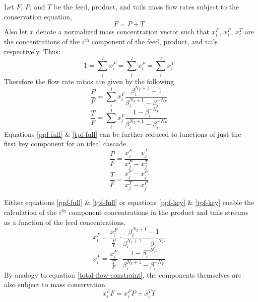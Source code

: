 \documentclass[preprint,12pt]{elsarticle}
\newcommand{\ith}[0]{$i^{\mbox{th}}$ }
\begin{document}
Let $F$, $P$, and $T$ be the feed, product, and tails mass flow rates subject to 
the conservation equation,
\begin{equation}
F = P + T
\label{total-flow-constraint}
\end{equation}
Also let $x$ denote a normalized mass concentration vector such that $x_i^F$, 
$x_i^P$, $x_i^T$ are the concentrations of the \ith component of the feed, product,
and tails respectively.  Thus:
\begin{equation}
1 = \sum_i^I x_i^F = \sum_i^I x_i^P = \sum_i^I x_i^T 
\end{equation}
Therefore the flow rate ratios are given by the following.
\begin{equation}
\frac{P}{F} = \sum_i^I x_i^F\frac{\beta_i^{N_T+1} - 1}
                                 {\beta_i^{N_T+1} - \beta_i^{-N_P}}
\label{ppf-full}
\end{equation}
\begin{equation}
\frac{T}{F} = \sum_i^I x_i^F\frac{1 - \beta_i^{-N_P}}
                                 {\beta_i^{N_T+1} - \beta_i^{-N_P}}
\label{tpf-full}
\end{equation}
Equations \ref{ppf-full} \&  \ref{tpf-full} can be further reduced to functions
of just the first key component for an ideal cascade.
\begin{equation}
\frac{P}{F} = \frac{x_j^F - x_j^T}{x_j^P - x_j^T}
\label{ppf-key}
\end{equation}
\begin{equation}
\frac{T}{F} = \frac{x_j^F - x_j^P}{x_j^T - x_j^P}
\label{tpf-key}
\end{equation}

Either equations \ref{ppf-full} \& \ref{tpf-full} or equations \ref{ppf-key} \& 
\ref{tpf-key} enable the calculation of the \ith component concentrations in the 
product and tails streams as a function of the feed concentrations.
\begin{equation}
x_i^P = \frac{x_i^F}{\frac{P}{F}}\cdot\frac{\beta_i^{N_T+1} - 1}
                                           {\beta_i^{N_T+1} - \beta_i^{-N_P}}
\label{prod-concentration}
\end{equation}
\begin{equation}
x_i^T = \frac{x_i^F}{\frac{T}{F}}\cdot\frac{1 - \beta_i^{-N_P}}
                                           {\beta_i^{N_T+1} - \beta_i^{-N_P}}
\label{tail-concentration}
\end{equation}
By analogy to equation \ref{total-flow-constraint}, the components themselves are
also subject to mass conservation:
\begin{equation}
x_i^FF = x_i^PP + x_i^TT
\label{comp-flow-constraint}
\end{equation}
\end{document}
